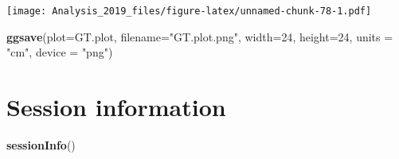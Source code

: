 \documentclass[
]{article}
\newenvironment{Shaded}{\begin{snugshade}}{\end{snugshade}}
\newcommand{\DataTypeTok}[1]{\textcolor[rgb]{0.13,0.29,0.53}{#1}}
\newcommand{\DecValTok}[1]{\textcolor[rgb]{0.00,0.00,0.81}{#1}}
\newcommand{\KeywordTok}[1]{\textcolor[rgb]{0.13,0.29,0.53}{\textbf{#1}}}
\newcommand{\NormalTok}[1]{#1}
\newcommand{\StringTok}[1]{\textcolor[rgb]{0.31,0.60,0.02}{#1}}
\begin{document}
\texttt{[image: Analysis\_2019\_files/figure-latex/unnamed-chunk-78-1.pdf]}

\begin{Shaded}
\begin{Highlighting}[]
\KeywordTok{ggsave}\NormalTok{(}\DataTypeTok{plot=}\NormalTok{GT.plot,}
       \DataTypeTok{filename=}\StringTok{"GT.plot.png"}\NormalTok{,}
       \DataTypeTok{width=}\DecValTok{24}\NormalTok{,}
       \DataTypeTok{height=}\DecValTok{24}\NormalTok{,}
       \DataTypeTok{units =} \StringTok{"cm"}\NormalTok{,}
       \DataTypeTok{device =} \StringTok{"png"}\NormalTok{)}
\end{Highlighting}
\end{Shaded}

\newpage

\hypertarget{session-information}{%
\section{Session information}\label{session-information}}

\begin{Shaded}
\begin{Highlighting}[]
\KeywordTok{sessionInfo}\NormalTok{()}
\end{Highlighting}
\end{Shaded}
\end{document}
